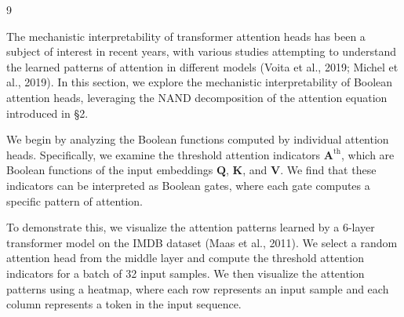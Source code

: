 \documentclass[11pt]{article}
\theoremstyle{definition}
\begin{document}
\begin{thebibliography}{9}













The mechanistic interpretability of transformer attention heads has been a subject of interest in recent years, with various studies attempting to understand the learned patterns of attention in different models (Voita et al., 2019; Michel et al., 2019). In this section, we explore the mechanistic interpretability of Boolean attention heads, leveraging the NAND decomposition of the attention equation introduced in §2.













We begin by analyzing the Boolean functions computed by individual attention heads. Specifically, we examine the threshold attention indicators $\mathbf{A}^\text{th}$, which are Boolean functions of the input embeddings $\mathbf{Q}$, $\mathbf{K}$, and $\mathbf{V}$. We find that these indicators can be interpreted as Boolean gates, where each gate computes a specific pattern of attention.













To demonstrate this, we visualize the attention patterns learned by a 6-layer transformer model on the IMDB dataset (Maas et al., 2011). We select a random attention head from the middle layer and compute the threshold attention indicators for a batch of 32 input samples. We then visualize the attention patterns using a heatmap, where each row represents an input sample and each column represents a token in the input sequence.













\begin{figure}[h]







\end{figure}
\end{thebibliography}
\end{document}
